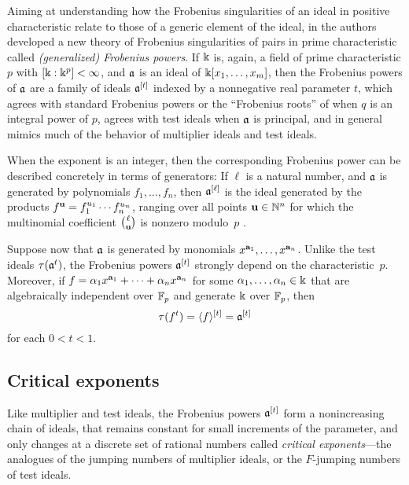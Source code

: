 \documentclass{amsart}
\begin{document}
Aiming at understanding how the Frobenius singularities of an ideal in positive characteristic relate to those of a generic element of the ideal, in \cite{hernandez+etal.frobenius_powers} the authors developed a new theory of Frobenius singularities of pairs in prime characteristic called \emph{\textup{(}generalized\textup{)} Frobenius powers}. 
If $\Bbbk$ is, again, a field of prime characteristic $p$ with $[\Bbbk:\Bbbk^p] <\infty$, and $\mathfrak{a}$ is an ideal of $\Bbbk[x_1, \ldots, x_m]$, then the Frobenius powers of $\mathfrak{a}$ are a family of ideals $\mathfrak{a}^{[t]}$ indexed by a nonnegative real parameter $t$, which agrees with standard Frobenius powers or the ``Frobenius roots'' of \cite{blickle+mustata+smith.discr_rat_FPTs} when $q$ is an integral power of $p$, agrees with test ideals when $\mathfrak{a}$ is principal, and in general mimics much of the behavior of multiplier ideals and test ideals.

\textcolor{nicered}{When the exponent is an integer, then the corresponding Frobenius power can be described concretely in terms of generators:
   If $\ell$ is a natural number, and $\mathfrak{a}$ is generated by polynomials $f_1, \ldots, f_n$, then $\mathfrak{a}^{[\ell]}$ is the ideal generated by the products $f^{\mathbf{u}} = f_1^{u_1}\cdots f_n^{u_n}$, ranging over all points $\mathbf{u} \in \mathbb{N}^n$ for which the multinomial coefficient $\binom{\ell}{\mathbf{u}}$ is nonzero modulo~$p$ \cite[Proposition~3.5]{hernandez+etal.frobenius_powers}.}

Suppose now that $\mathfrak{a}$ is generated by monomials $x^{\mathbf{a}_1},\ldots,x^{\mathbf{a}_n}$.
Unlike the test ideals $\tau(\mathfrak{a}^t)$, the Frobenius powers $\mathfrak{a}^{[t]}$ strongly depend on the characteristic~$p$.
Moreover, if $f=\alpha_1x^{\mathbf{a}_1}+\cdots+\alpha_nx^{\mathbf{a}_n}$ for some $\alpha_1,\ldots,\alpha_n \in \Bbbk$ that are algebraically independent over $\mathbb{F}_p$ and generate $\Bbbk$ over $\mathbb{F}_p$, then
\[\tau(f^t) = \langle f \rangle^{[t]} = \mathfrak{a}^{[t]}\]
for each $0<t<1$.

\subsection{Critical exponents}
Like multiplier and test ideals, the Frobenius powers $\mathfrak{a}^{[t]}$ form a nonincreasing chain of ideals, that remains constant for small increments of the parameter, and only changes at a discrete set of rational numbers called \emph{critical exponents}---the analogues of the jumping numbers of multiplier ideals, or the $F$-jumping numbers of test ideals.
\end{document}
